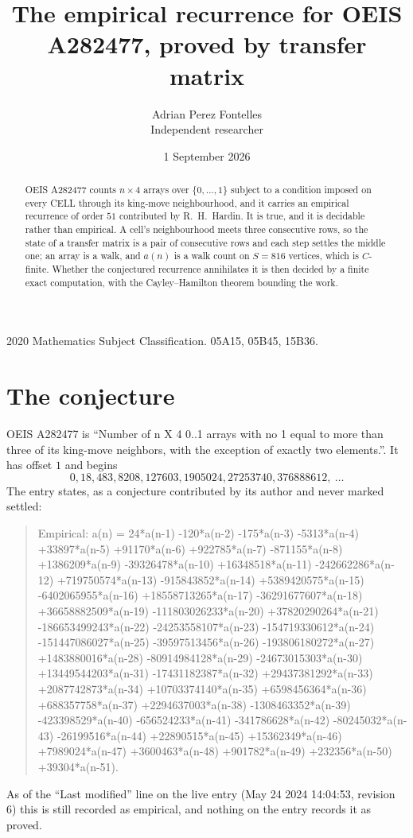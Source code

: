 \documentclass[11pt,a4paper]{article}
\title{The empirical recurrence for OEIS A282477, proved by transfer matrix}
\author{Adrian Perez Fontelles\\ \small Independent researcher}
\date{1 September 2026}
\theoremstyle{plain}
\theoremstyle{definition}
\begin{document}
\maketitle

\begin{abstract}
OEIS A282477 counts $n\times4$ arrays over $\{0,\dots,1\}$ subject to a condition imposed on
every CELL through its king-move neighbourhood, and it carries an empirical recurrence of
order $51$ contributed by R.~H.~Hardin. It is true, and it is decidable rather than
empirical. A cell's neighbourhood meets three consecutive rows, so the state of a transfer
matrix is a pair of consecutive rows and each step settles the middle one; an array is a
walk, and $a(n)$ is a walk count on $S=816$ vertices, which is $C$-finite. Whether the
conjectured recurrence annihilates it is then decided by a finite exact computation, with the
Cayley--Hamilton theorem bounding the work.
\end{abstract}

\noindent\small 2020 Mathematics Subject Classification. 05A15, 05B45, 15B36.\normalsize

\section{The conjecture}

OEIS A282477 is ``Number of n X 4 0..1 arrays with no 1 equal to more than three of its king-move neighbors, with the exception of exactly two elements.''. It has offset $1$ and begins
\[
0, 18, 483, 8208, 127603, 1905024, 27253740, 376888612,\ \dots
\]
The entry states, as a conjecture contributed by its author and never marked settled:
\begin{quote}
Empirical: a(n) = 24*a(n-1) -120*a(n-2) -175*a(n-3) -5313*a(n-4) +33897*a(n-5) +91170*a(n-6) +922785*a(n-7) -871155*a(n-8) +1386209*a(n-9) -39326478*a(n-10) +16348518*a(n-11) -242662286*a(n-12) +719750574*a(n-13) -915843852*a(n-14) +5389420575*a(n-15) -6402065955*a(n-16) +18558713265*a(n-17) -36291677607*a(n-18) +36658882509*a(n-19) -111803026233*a(n-20) +37820290264*a(n-21) -186653499243*a(n-22) -24253558107*a(n-23) -154719330612*a(n-24) -151447086027*a(n-25) -39597513456*a(n-26) -193806180272*a(n-27) +1483880016*a(n-28) -80914984128*a(n-29) -24673015303*a(n-30) +13449544203*a(n-31) -17431182387*a(n-32) +29437381292*a(n-33) +2087742873*a(n-34) +10703374140*a(n-35) +6598456364*a(n-36) +688357758*a(n-37) +2294637003*a(n-38) -1308463352*a(n-39) -423398529*a(n-40) -656524233*a(n-41) -341786628*a(n-42) -80245032*a(n-43) -26199516*a(n-44) +22890515*a(n-45) +15362349*a(n-46) +7989024*a(n-47) +3600463*a(n-48) +901782*a(n-49) +232356*a(n-50) +39304*a(n-51).
\end{quote}
As of the ``Last modified'' line on the live entry (May 24 2024 14:04:53, revision 6) this is still
recorded as empirical, and nothing on the entry records it as proved.
\end{document}
